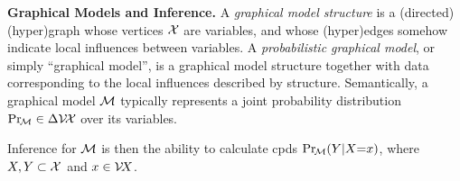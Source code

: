 \documentclass{article}
\newcommand\discard[1]{}
\begin{document}
\textbf{Graphical Models and Inference.}
A \emph{graphical model structure}
is a (directed) (hyper)graph whose vertices $\mathcal X$ are variables, and whose (hyper)edges somehow indicate local influences between variables.
A \emph{probabilistic graphical model},
or simply  ``graphical model'',
is a
graphical model structure
together with data corresponding to the local influences described by structure.
%
Semantically,
a graphical model $\cal M$
typically
represents a joint probability distribution $\Pr_{\!\cal M}
 \in \Delta \mathcal V\!\mathcal X$ over its variables.
\discard{
    Although there is often more to the story,
    it can typically be
    expressed as a product
    $\Pr_{\!\cal M}(\X) \propto \prod_{E \in \Ed} \phi_{E}(E)$
    of factors $\boldsymbol\phi = 
    \{ \phi_E : \V E \to \mathbb R_{\ge 0} \}_{E \in \Ed}$
    over a hypergraph $(\X, \Ed)$ closely related to the structure of $\cal M$.
    For this reason, some authors use the term ``graphical model'' to refer to a tuple $(\X ,\Ed, \boldsymbol\phi)$,
    i.e., a factor graph.
    PDGs, however, do not represent probabilities this way.}
Inference for $\cal M$ is then the ability to calculate cpds $\Pr_{\!\cal M}(Y|X{=}x)$,
where $X,Y \subset \mathcal X$ and $x \in \mathcal V\! X$. 
\end{document}
